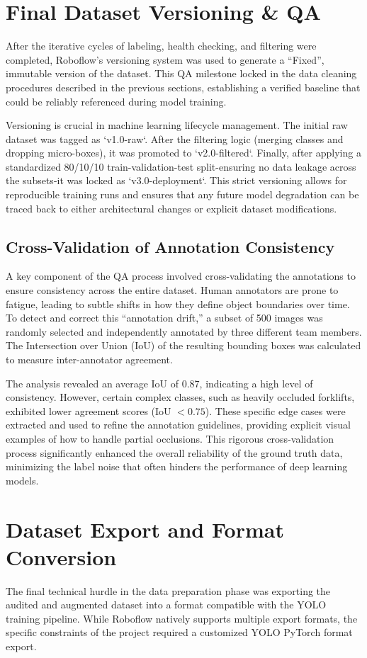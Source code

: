 \section{Final Dataset Versioning \& QA}
After the iterative cycles of labeling, health checking, and filtering were completed, Roboflow's versioning system was used to generate a ``Fixed'', immutable version of the dataset. This QA milestone locked in the data cleaning procedures described in the previous sections, establishing a verified baseline that could be reliably referenced during model training. 

Versioning is crucial in machine learning lifecycle management. The initial raw dataset was tagged as `v1.0-raw`. After the filtering logic (merging classes and dropping micro-boxes), it was promoted to `v2.0-filtered`. Finally, after applying a standardized 80/10/10 train-validation-test split-ensuring no data leakage across the subsets-it was locked as `v3.0-deployment`. This strict versioning allows for reproducible training runs and ensures that any future model degradation can be traced back to either architectural changes or explicit dataset modifications.

\subsection{Cross-Validation of Annotation Consistency}
A key component of the QA process involved cross-validating the annotations to ensure consistency across the entire dataset. Human annotators are prone to fatigue, leading to subtle shifts in how they define object boundaries over time. To detect and correct this ``annotation drift,'' a subset of 500 images was randomly selected and independently annotated by three different team members. The Intersection over Union (IoU) of the resulting bounding boxes was calculated to measure inter-annotator agreement. 

The analysis revealed an average IoU of 0.87, indicating a high level of consistency. However, certain complex classes, such as heavily occluded forklifts, exhibited lower agreement scores (IoU $< 0.75$). These specific edge cases were extracted and used to refine the annotation guidelines, providing explicit visual examples of how to handle partial occlusions. This rigorous cross-validation process significantly enhanced the overall reliability of the ground truth data, minimizing the label noise that often hinders the performance of deep learning models.

\section{Dataset Export and Format Conversion}
The final technical hurdle in the data preparation phase was exporting the audited and augmented dataset into a format compatible with the YOLO training pipeline. While Roboflow natively supports multiple export formats, the specific constraints of the project required a customized YOLO PyTorch format export.

